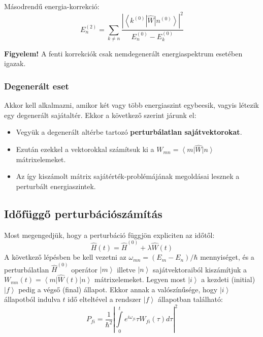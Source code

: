 \documentclass[12pt]{article}
\theoremstyle{plain}
\newcommand{\ket}[1]{\left| #1 \right >}
\newcommand{\bra}[1]{\left < #1 \right |}
\begin{document}
Másodrendű energia-korrekció:
\[
    E_n^{(2)} = \sum\limits_{k\neq n}\frac{\left|\bra{k^{(0)}} \hat W \ket{n^{(0)}}\right|^2}{E_n^{(0)}-E_k^{(0)}}    
\]

\textbf{Figyelem!} A fenti korrekciók csak nemdegenerált energiaspektrum esetében igazak.

\subsubsection{Degenerált eset}
Akkor kell alkalmazni, amikor két vagy több energiaszint egybeesik, vagyis létezik egy degenerált sajátaltér.
Ekkor a következő szerint járunk el:
\begin{itemize}
    \item Vegyük a degenerált altérbe tartozó \textbf{perturbálatlan sajátvektorokat}. 
    \item Ezután ezekkel a vektorokkal számítsuk ki a $W_{mn} = \bra m \hat W \ket n$ mátrixelemeket.
    \item Az így kiszámolt mátrix sajátérték-problémájának megoldásai lesznek a perturbált energiaszintek.
\end{itemize}
\subsection{Időfüggő perturbációszámítás}
Most megengedjük, hogy a perturbáció függjön expliciten az időtől:
\[
    \hat H(t) = \hat H^{(0)} + \lambda\hat W(t)
\]
A következő lépésben be kell vezetni az $\omega_{mn} = (E_m-E_n)/\hbar$ mennyiséget, és a 
perturbálatlan $\hat H^{(0)}$ operátor $\ket m$ illetve $\ket n$ sajátvektoraiból kiszámítjuk
a $W_{mn}(t) = \bra m \hat W(t)\ket n$ mátrixelemeket. Legyen most $\ket i$ a kezdeti (initial) $\ket f$
pedig a végső (final) állapot. Ekkor annak a valószínűsége, hogy $\ket i$ állapotból indulva $t$
idő elteltével a rendszer $\ket f$ állapotban található:
\[
    P_{fi} = \frac{1}{\hbar^2}\left|\int\limits_0^t e^{i\omega_{fi}}\tau W_{fi}(\tau)d\tau\right|^2   
\]
\end{document}
